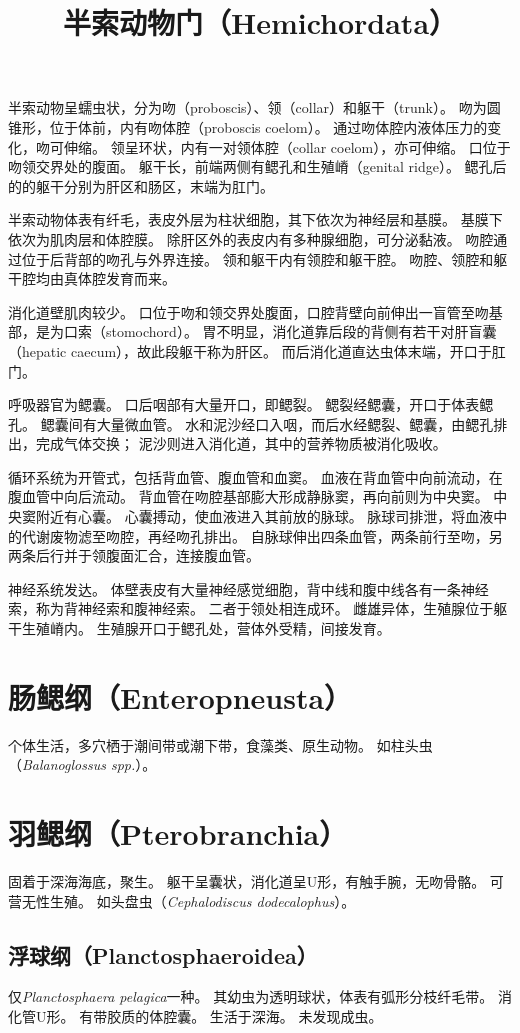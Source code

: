 \documentclass[11pt]{article}
\title{半索动物门（Hemichordata）}
\date{}
\begin{document}
  \maketitle

  \linenumbers
半索动物呈蠕虫状，分为吻（proboscis）、领（collar）和躯干（trunk）。
吻为圆锥形，位于体前，内有吻体腔（proboscis coelom）。
通过吻体腔内液体压力的变化，吻可伸缩。
领呈环状，内有一对领体腔（collar coelom），亦可伸缩。
口位于吻领交界处的腹面。
躯干长，前端两侧有鳃孔和生殖嵴（genital ridge）。
鳃孔后的的躯干分别为肝区和肠区，末端为肛门。

\newline

半索动物体表有纤毛，表皮外层为柱状细胞，其下依次为神经层和基膜。
基膜下依次为肌肉层和体腔膜。
除肝区外的表皮内有多种腺细胞，可分泌黏液。
吻腔通过位于后背部的吻孔与外界连接。
领和躯干内有领腔和躯干腔。
吻腔、领腔和躯干腔均由真体腔发育而来。

\newline

消化道壁肌肉较少。
口位于吻和领交界处腹面，口腔背壁向前伸出一盲管至吻基部，是为口索（stomochord）。
胃不明显，消化道靠后段的背侧有若干对肝盲囊（hepatic caecum），故此段躯干称为肝区。
而后消化道直达虫体末端，开口于肛门。

\newline

呼吸器官为鳃囊。
口后咽部有大量开口，即鳃裂。
鳃裂经鳃囊，开口于体表鳃孔。
鳃囊间有大量微血管。
水和泥沙经口入咽，而后水经鳃裂、鳃囊，由鳃孔排出，完成气体交换；
泥沙则进入消化道，其中的营养物质被消化吸收。

\newline

循环系统为开管式，包括背血管、腹血管和血窦。
血液在背血管中向前流动，在腹血管中向后流动。
背血管在吻腔基部膨大形成静脉窦，再向前则为中央窦。
中央窦附近有心囊。
心囊搏动，使血液进入其前放的脉球。
脉球司排泄，将血液中的代谢废物滤至吻腔，再经吻孔排出。
自脉球伸出四条血管，两条前行至吻，另两条后行并于领腹面汇合，连接腹血管。

\newline

神经系统发达。
体壁表皮有大量神经感觉细胞，背中线和腹中线各有一条神经索，称为背神经索和腹神经索。
二者于领处相连成环。
雌雄异体，生殖腺位于躯干生殖嵴内。
生殖腺开口于鳃孔处，营体外受精，间接发育。

\section{肠鳃纲（Enteropneusta）}
个体生活，多穴栖于潮间带或潮下带，食藻类、原生动物。
如柱头虫（\textit{Balanoglossus spp.}）。

\section{羽鳃纲（Pterobranchia）}
固着于深海海底，聚生。
躯干呈囊状，消化道呈U形，有触手腕，无吻骨骼。
可营无性生殖。
如头盘虫（\textit{Cephalodiscus dodecalophus}）。

\subsection{浮球纲（Planctosphaeroidea）}
仅\textit{Planctosphaera pelagica}一种。
其幼虫为透明球状，体表有弧形分枝纤毛带。
消化管U形。
有带胶质的体腔囊。
生活于深海。
未发现成虫。
\end{document}
